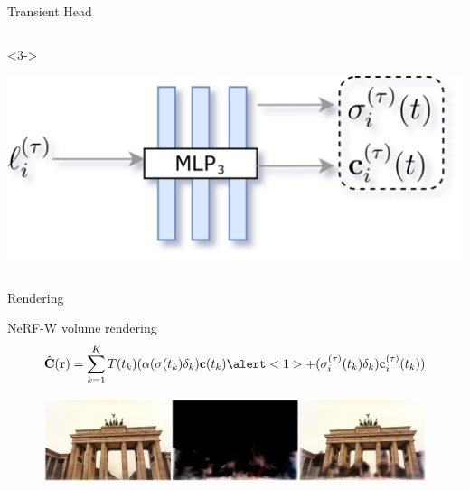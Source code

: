 \documentclass[aspectratio=1610]{beamer}
\begin{document}
\begin{frame}{Transient Head}
\begin{columns}
\begin{column}{.5\textwidth}
\begin{onlyenv}
\begin{center}
                \end{center}
            \end{onlyenv}
            \begin{onlyenv}<3->
                \begin{center}
                    \includegraphics[width=.9\textwidth]{nerfu-t.png}
                \end{center}
            \end{onlyenv}
        \end{column}
    \end{columns}
\end{frame}

\begin{frame}{Rendering}
    \begin{block}{NeRF-W volume rendering}
        \begin{equation*}
            \hat{\vb{C}}(\vb{r}) = \sum_{k = 1}^{K} T(t_k) ( \alpha (\sigma (t_k)\delta_k)  \vb{c}(t_k)  \alert<1>{+ (\sigma_i^{(\tau)} (t_k)\delta_k)  \vb{c}_i^{(\tau)}(t_k)})
        \end{equation*}
    \end{block}
    \bigskip
    \pause
    \begin{figure}[H]
        \centering
        \includegraphics[width=.75\textwidth]{render.png}
    \end{figure}
\end{frame}
\end{document}
